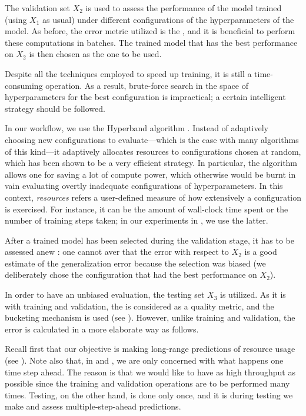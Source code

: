 The validation set $X_2$ is used to assess the performance of the model trained
(using $X_1$ as usual) under different configurations of the hyperparameters of
the model. As before, the error metric utilized is the , and it is
beneficial to perform these computations in batches. The trained model that has
the best performance on $X_2$ is then chosen as the one to be used.

Despite all the techniques employed to speed up training, it is still a
time-consuming operation. As a result, brute-force search in the space of
hyperparameters for the best configuration is impractical; a certain intelligent
strategy should be followed.

In our workflow, we use the Hyperband algorithm \cite{li2016}. Instead of
adaptively choosing new configurations to evaluate---which is the case with many
algorithms of this kind---it adaptively allocates resources to configurations
chosen at random, which has been shown to be a very efficient strategy. In
particular, the algorithm allows one for saving a lot of compute power, which
otherwise would be burnt in vain evaluating overtly inadequate configurations of
hyperparameters. In this context, \emph{resources} refers a user-defined measure
of how extensively a configuration is exercised. For instance, it can be the
amount of wall-clock time spent or the number of training steps taken; in our
experiments in , we use the latter.

After a trained model has been selected during the validation stage, it has to
be assessed anew \cite{hastie2009}: one cannot aver that the error with respect
to $X_2$ is a good estimate of the generalization error because the selection
was biased (we deliberately chose the configuration that had the best
performance on $X_2$).

In order to have an unbiased evaluation, the testing set $X_3$ is utilized. As
it is with training and validation, the  is considered as a quality
metric, and the bucketing mechanism is used (see ). However,
unlike training and validation, the error is calculated in a more elaborate way
as follows.

Recall first that our objective is making long-range predictions of resource
usage (see ). Note also that, in  and
, we are only concerned with what happens one time step ahead.
The reason is that we would like to have as high throughput as possible since
the training and validation operations are to be performed many times. Testing,
on the other hand, is done only once, and it is during testing we make and
assess multiple-step-ahead predictions.

